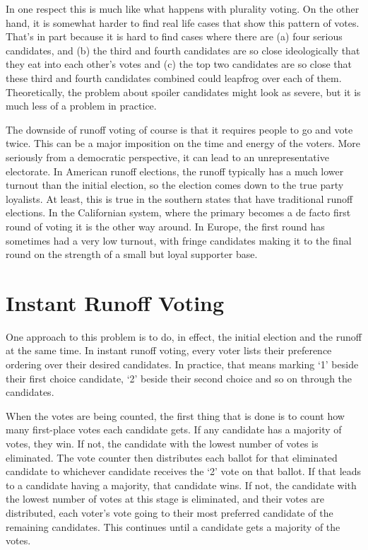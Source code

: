 \documentclass[openany]{book}
\begin{document}
In one respect this is much like what happens with plurality voting. On the other hand, it is somewhat harder to find real life cases that show this pattern of votes. That's in part because it is hard to find cases where there are (a) four serious candidates, and (b) the third and fourth candidates are so close ideologically that they eat into each other's votes and (c) the top two candidates are so close that these third and fourth candidates combined could leapfrog over each of them. Theoretically, the problem about spoiler candidates might look as severe, but it is much less of a problem in practice.

The downside of runoff voting of course is that it requires people to go and vote twice. This can be a major imposition on the time and energy of the voters. More seriously from a democratic perspective, it can lead to an unrepresentative electorate. In American runoff elections, the runoff typically has a much lower turnout than the initial election, so the election comes down to the true party loyalists. At least, this is true in the southern states that have traditional runoff elections. In the Californian system, where the primary becomes a de facto first round of voting it is the other way around. In Europe, the first round has sometimes had a very low turnout, with fringe candidates making it to the final round on the strength of a small but loyal supporter base.

\section{Instant Runoff Voting}
One approach to this problem is to do, in effect, the initial election and the runoff at the same time. In instant runoff voting, every voter lists their preference ordering over their desired candidates. In practice, that means marking `1' beside their first choice candidate, `2' beside their second choice and so on through the candidates. 

When the votes are being counted, the first thing that is done is to count how many first-place votes each candidate gets. If any candidate has a majority of votes, they win. If not, the candidate with the lowest number of votes is eliminated. The vote counter then distributes each ballot for that eliminated candidate to whichever candidate receives the `2' vote on that ballot. If that leads to a candidate having a majority, that candidate wins. If not, the candidate with the lowest number of votes at this stage is eliminated, and their votes are distributed, each voter's vote going to their most preferred candidate of the remaining candidates. This continues until a candidate gets a majority of the votes.
\end{document}
